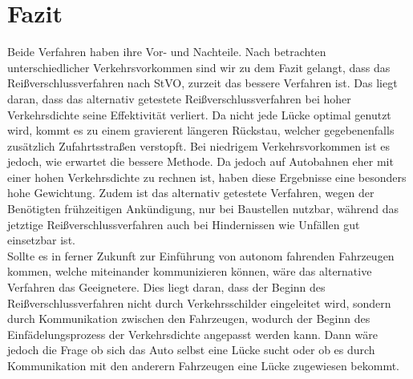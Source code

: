 \chapter{Fazit}
Beide Verfahren haben ihre Vor- und Nachteile. Nach betrachten unterschiedlicher Verkehrsvorkommen sind wir zu dem Fazit gelangt, dass das Reißverschlussverfahren nach StVO, zurzeit das bessere Verfahren ist.
Das liegt daran, dass das alternativ getestete Reißverschlussverfahren bei hoher Verkehrsdichte seine Effektivität verliert. Da nicht jede Lücke optimal genutzt wird, kommt es zu einem gravierent längeren Rückstau, welcher gegebenenfalls zusätzlich Zufahrtsstraßen verstopft. Bei niedrigem Verkehrsvorkommen ist es jedoch, wie erwartet die bessere Methode. Da jedoch auf Autobahnen eher mit einer hohen Verkehrsdichte zu rechnen ist, haben diese Ergebnisse eine besonders hohe Gewichtung. Zudem ist das alternativ getestete Verfahren, wegen der Benötigten frühzeitigen Ankündigung, nur bei Baustellen nutzbar, während das jetztige Reißverschlussverfahren auch bei Hindernissen wie Unfällen gut einsetzbar ist.\\
Sollte es in ferner Zukunft zur Einführung von autonom fahrenden Fahrzeugen kommen, welche miteinander kommunizieren können, wäre das alternative Verfahren das Geeignetere. Dies liegt daran, dass der Beginn des Reißverschlussverfahren nicht durch Verkehrsschilder eingeleitet wird, sondern durch Kommunikation zwischen den Fahrzeugen, wodurch der Beginn des Einfädelungsprozess der Verkehrsdichte angepasst werden kann. Dann wäre jedoch die Frage ob sich das Auto selbst eine Lücke sucht oder ob es durch Kommunikation mit den anderern Fahrzeugen eine Lücke zugewiesen bekommt. 